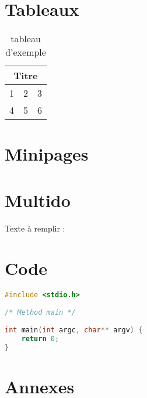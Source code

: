 \documentclass[a4paper]{article}
\newcommand{\emptyLines}[1]{%
\multido{\iN=1+1}{#1}{\phantom{}\dotfill\newline}
}
\begin{document}

\section{Tableaux}

\begin{table}[!h] %
\begin{center}
	
\begin{tabular}{|c|c|c|}
	\hline
	\multicolumn{3}{|c|}{Titre} \\ \hline
	1	&	2	&	3 \\ \hline
	4	&	5	&	6 \\ \hline
\end{tabular}

\caption{tableau d'exemple}
\end{center}
\end{table}

\section{Minipages}
\hspace{0.5cm}%

\section{Multido}

Texte à remplir :

\emptyLines{10}

\section{Code}

\begin{lstlisting}[language=C,title=Code C,captionpos=b]
#include <stdio.h>
	
/* Method main */
	
int main(int argc, char** argv) {
	return 0;
}
\end{lstlisting}




\section*{Annexes} %
\end{document}
